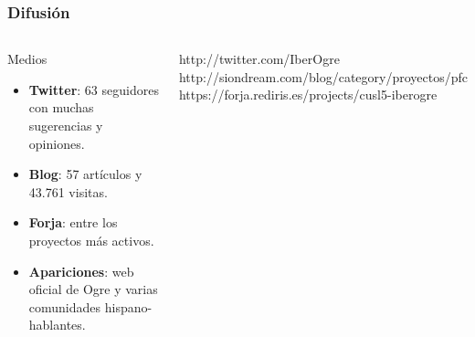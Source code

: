 \documentclass[green]{beamer}
\begin{document}
\begin{frame}
\transdissolve
    \frametitle{Difusión}
    
    \begin{columns}[t]
    \column{200pt}
	
	\scriptsize{
	\begin{block}{Medios}
            \begin{itemize}
                \item \textbf{Twitter}: 63 seguidores con muchas sugerencias y opiniones.
		\item \textbf{Blog}: 57 artículos y 43.761 visitas.
		\item \textbf{Forja}: entre los proyectos más activos.
		\item \textbf{Apariciones}: web oficial de Ogre y varias comunidades hispano-hablantes.
            \end{itemize}            
        \end{block}
	
	\begin{block}{}
            http://twitter.com/IberOgre
	    http://siondream.com/blog/category/proyectos/pfc
	    https://forja.rediris.es/projects/cusl5-iberogre
        \end{block}
	}
	

    \column{100pt}
	

\end{columns}
\end{frame}
\end{document}
